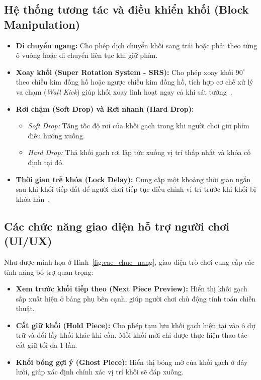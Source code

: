 \documentclass[12pt,a4paper,oneside]{report}
\begin{document}
\subsection{Hệ thống tương tác và điều khiển khối (Block Manipulation)}
\begin{itemize}
    \item \textbf{Di chuyển ngang:} Cho phép dịch chuyển khối sang trái hoặc phải theo từng ô vuông hoặc di chuyển liên tục khi giữ phím.
    \item \textbf{Xoay khối (Super Rotation System - SRS):} Cho phép xoay khối $90^\circ$ theo chiều kim đồng hồ hoặc ngược chiều kim đồng hồ, tích hợp cơ chế xử lý va chạm (\textit{Wall Kick}) giúp khối xoay linh hoạt ngay cả khi sát tường~\cite{tetris_guideline}.
    \item \textbf{Rơi chậm (Soft Drop) và Rơi nhanh (Hard Drop):} 
    \begin{itemize}
        \item \textit{Soft Drop:} Tăng tốc độ rơi của khối gạch trong khi người chơi giữ phím điều hướng xuống.
        \item \textit{Hard Drop:} Thả khối gạch rơi lập tức xuống vị trí thấp nhất và khóa cố định tại đó.
    \end{itemize}
    \item \textbf{Thời gian trễ khóa (Lock Delay):} Cung cấp một khoảng thời gian ngắn sau khi khối tiếp đất để người chơi tiếp tục điều chỉnh vị trí trước khi khối bị khóa hẳn~\cite{tetris_lock}.
\end{itemize}

\subsection{Các chức năng giao diện hỗ trợ người chơi (UI/UX)}
Như được minh họa ở Hình~\ref{fig:cac_chuc_nang}, giao diện trò chơi cung cấp các tính năng bổ trợ quan trọng:
\begin{itemize}
    \item \textbf{Xem trước khối tiếp theo (Next Piece Preview):} Hiển thị khối gạch sắp xuất hiện ở bảng phụ bên cạnh, giúp người chơi chủ động tính toán chiến thuật.
    \item \textbf{Cất giữ khối (Hold Piece):} Cho phép tạm lưu khối gạch hiện tại vào ô dự trữ và đổi lấy khối khác khi cần. Mỗi khối mới chỉ được thực hiện thao tác cất giữ tối đa 1 lần.
    \item \textbf{Khối bóng gợi ý (Ghost Piece):} Hiển thị bóng mờ của khối gạch ở đáy lưới, giúp xác định chính xác vị trí khối sẽ đáp xuống.
\end{itemize}
\end{document}
